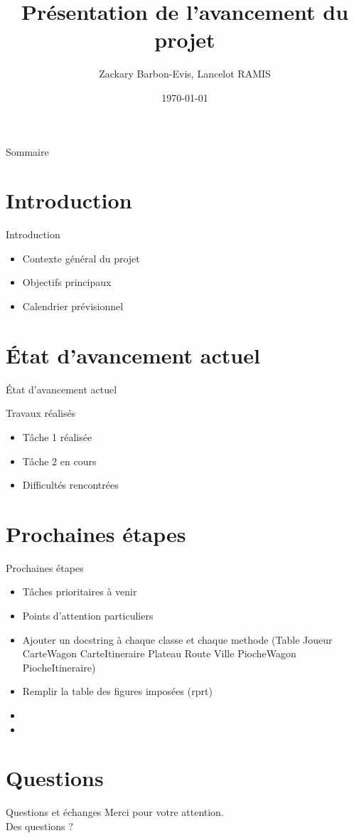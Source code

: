 \documentclass{beamer}
\title[Avancement Projet Info]{Présentation de l'avancement du projet}
\author{Zackary Barbon-Evis, Lancelot RAMIS}
\date{\today}
\begin{document}
\frame{\titlepage}

\begin{frame}{Sommaire}
    \tableofcontents
\end{frame}

\section{Introduction}

\begin{frame}{Introduction}
    \begin{itemize}
        \item Contexte général du projet
        \item Objectifs principaux
        \item Calendrier prévisionnel
    \end{itemize}
\end{frame}

\section{État d'avancement actuel}

\begin{frame}{État d'avancement actuel}
    \begin{block}{Travaux réalisés}
        \begin{itemize}
            \item Tâche 1 réalisée
            \item Tâche 2 en cours
            \item Difficultés rencontrées
        \end{itemize}
    \end{block}
\end{frame}

\section{Prochaines étapes}

\begin{frame}{Prochaines étapes}
    \begin{itemize}
        \item Tâches prioritaires à venir
        \item Points d'attention particuliers
        \item
Ajouter un docstring à chaque classe et chaque methode
(Table
Joueur
CarteWagon
CarteItineraire
Plateau
Route
Ville
PiocheWagon
PiocheItineraire)
        \item
Remplir la table des figures imposées (rprt)

        \item
        \item
    \end{itemize}
\end{frame}

\section{Questions}

\begin{frame}{Questions et échanges}
    \centering
    Merci pour votre attention.\\[1cm]
    Des questions ?
\end{frame}
\end{document}
